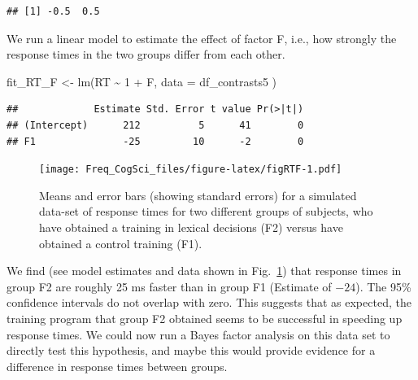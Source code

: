 \documentclass[
  12pt,
]{krantz}
\newenvironment{Shaded}{\begin{snugshade}}{\end{snugshade}}
\newcommand{\AttributeTok}[1]{\textcolor[rgb]{0.77,0.63,0.00}{#1}}
\newcommand{\DecValTok}[1]{\textcolor[rgb]{0.00,0.00,0.81}{#1}}
\newcommand{\FunctionTok}[1]{\textcolor[rgb]{0.00,0.00,0.00}{#1}}
\newcommand{\NormalTok}[1]{#1}
\newcommand{\OtherTok}[1]{\textcolor[rgb]{0.56,0.35,0.01}{#1}}
\newcommand{\SpecialCharTok}[1]{\textcolor[rgb]{0.00,0.00,0.00}{#1}}
\theoremstyle{definition}
\theoremstyle{definition}
\theoremstyle{definition}
\theoremstyle{definition}
\theoremstyle{remark}
\begin{document}
\begin{verbatim}
## [1] -0.5  0.5
\end{verbatim}

We run a linear model to estimate the effect of factor F, i.e., how strongly the response times in the two groups differ from each other.

\begin{Shaded}
\begin{Highlighting}[]
\NormalTok{fit\_RT\_F }\OtherTok{\textless{}{-}} \FunctionTok{lm}\NormalTok{(RT }\SpecialCharTok{\textasciitilde{}} \DecValTok{1} \SpecialCharTok{+}\NormalTok{ F,}
  \AttributeTok{data =}\NormalTok{ df\_contrasts5}
\NormalTok{)}
\end{Highlighting}
\end{Shaded}

\begin{Shaded}
\end{Shaded}

\begin{verbatim}
##             Estimate Std. Error t value Pr(>|t|)
## (Intercept)      212          5      41        0
## F1               -25         10      -2        0
\end{verbatim}

\begin{figure}
\centering
\texttt{[image: Freq\_CogSci\_files/figure-latex/figRTF-1.pdf]}
\caption{\label{fig:figRTF}Means and error bars (showing standard errors) for a simulated data-set of response times for two different groups of subjects, who have obtained a training in lexical decisions (F2) versus have obtained a control training (F1).}
\end{figure}

We find (see model estimates and data shown in Fig.~\ref{fig:figRTF}) that response times in group F2 are roughly 25 ms faster than in group F1 (Estimate of \(-24\)). The 95\% confidence intervals do not overlap with zero. This suggests that as expected, the training program that group F2 obtained seems to be successful in speeding up response times. We could now run a Bayes factor analysis on this data set to directly test this hypothesis, and maybe this would provide evidence for a difference in response times between groups.
\end{document}
